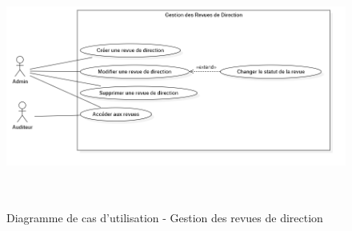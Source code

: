 \begin{figure}[H]
    \centering
    \includegraphics[width=12cm,height=8cm]{images/revuedirectionuc.png}
    \caption{Diagramme de cas d'utilisation - Gestion des revues de direction}
\end{figure}

